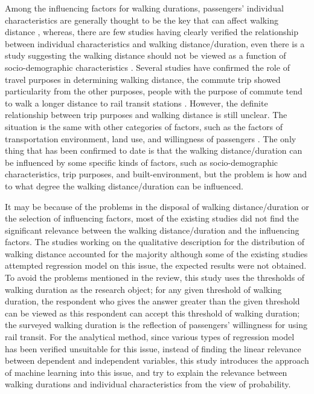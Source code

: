 %
Among the influencing factors for walking durations, passengers' individual characteristics are generally thought to be the key that can affect walking distance \cite{besser2005walking,weinstein2008far,krygsman2004multimodal,yang2012walking,daniels2013explaining,guerra2012half}, whereas, there are few studies having clearly verified the relationship between individual characteristics and walking distance/duration, even there is a study suggesting the walking distance should not be viewed as a function of socio-demographic characteristics \cite{krygsman2004multimodal}. Several studies have confirmed the role of travel purposes in determining walking distance, the commute trip showed particularity from the other purposes, people with the purpose of commute tend to walk a longer distance to rail transit stations \cite{larsen2010beyond}. However, the definite relationship between trip purposes and walking distance is still unclear. The situation is the same with other categories of factors, such as the factors of transportation environment, land use, and willingness of passengers \cite{guerra2012half,krygsman2004multimodal,weinstein2008far}. The only thing that has been confirmed to date is that the walking distance/duration can be influenced by some specific kinds of factors, such as socio-demographic characteristics, trip purposes, and built-environment, but the problem is how and to what degree the walking distance/duration can be influenced.

%
It may be because of the problems in the disposal of walking distance/duration or the selection of influencing factors, most of the existing studies did not find the significant relevance between the walking distance/duration and the influencing factors. The studies working on the qualitative description for the distribution of walking distance accounted for the majority although some of the existing studies attempted regression model on this issue, the expected results were not obtained. To avoid the problems mentioned in the review, this study uses the thresholds of walking duration as the research object; for any given threshold of walking duration, the respondent who gives the answer greater than the given threshold can be viewed as this respondent can accept this threshold of walking duration; the surveyed walking duration is the reflection of passengers' willingness for using rail transit. For the analytical method, since various types of regression model has been verified unsuitable for this issue, instead of finding the linear relevance between dependent and independent variables, this study introduces the approach of machine learning into this issue, and try to explain the relevance between walking durations and individual characteristics from the view of probability.

